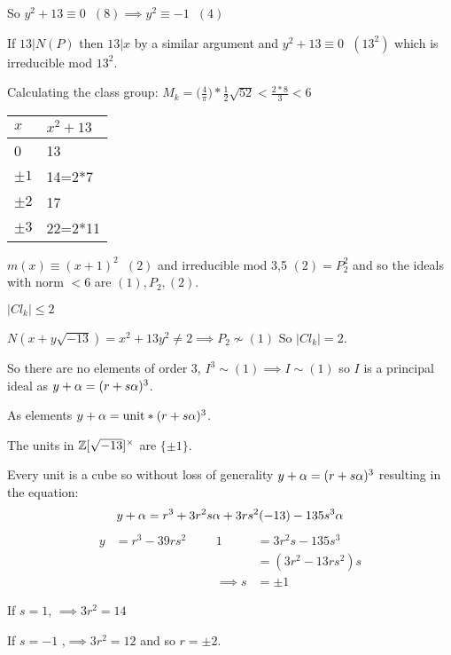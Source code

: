 \documentclass[11pt]{article}
\begin{document}
So $y^2 + 13 \equiv 0 \hspace{7pt} (8) \implies y^2 \equiv -1 \hspace{7pt} (4)$ \lightning
\spa

If $13 | N(P)$ then $13| x$ by a similar argument and $y^2 + 13 \equiv 0 \hspace{7pt} (13^2)$ which is irreducible mod $13^2$. \lightning


Calculating the class group: $M_k = \big(\frac4\pi \big)* \frac12 \sqrt{52} < \frac{2*8}3 < 6$ 

\begin{tabular}{|l|l|}
	\hline
	$x$                    & $x^2 + 13$ \\ \hline
	0                      & 13         \\
	$\pm 1$                & 14=2*7     \\
	$\pm 2$                & 17         \\
	$\pm 3$ & 22=2*11 \\  \hline
\end{tabular}
\spac
	$m(x) \equiv (x+1)^2 \hspace{7pt} (2)$ and 
	irreducible mod 3,5
	\spac
$(2) = P_2^2$ and so the ideals with norm $<6$ are $(1), P_2, (2)$.
\spa

$|Cl_k| \leq 2$ 

$ N(x+y\sqrt{-13}) = x^2+ 13y^2 \neq 2 \implies P_2\not \sim(1)$
\spac
So $|Cl_k| = 2$.

So there are no elements of order 3, $I^3 \sim (1) \implies I \sim (1)$ so $I$ is a principal ideal as $y+\alpha = (r+s\alpha)^3$.

As elements $y+\alpha = \text{unit} * (r+s\alpha)^3$.
\spa

The units in $\mathbb{Z}[\sqrt{-13}]^\times$ are $\{\pm 1\}$.
\spa

Every unit is a cube so without loss of generality $y+\alpha = (r+s\alpha)^3$ resulting in the equation:
\begin{align*}
	y+\alpha = r^3 + 3r^2 s \alpha + 3rs^2 (-13) - 135s^3 \alpha
\end{align*}
\begin{align*}
	y &= r^3-39rs^2  &&& 1&=3r^2s - 135s^3\\
	&&&&& =(3r^2 - 13rs^2)s\\
	&&&& \implies s &= \pm 1
\end{align*}

If $s =1$, $\implies 3r^2 = 14 $ \lightning
\spa

If $s= -1 $ ,$\implies 3r^2 = 12$ and so $r = \pm 2$.
\spa
\end{document}
